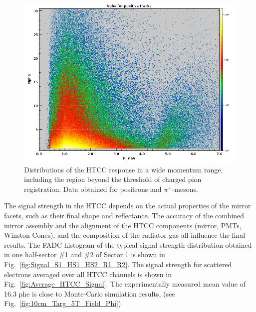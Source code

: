 \begin{figure}[!ht]
    \centering
    \includegraphics[width=1.0\linewidth,trim={0.0cm 0.0cm 0.0cm 0.0cm},clip]{images/positivePNPEC6595.png}
    \caption{Distributions of the HTCC response in a wide momentum range, including the region beyond the threshold of charged pion registration. Data obtained for positrons and $\pi^{+}$-mesons.}
    \label{fig:positivePNPEC6595}
\end{figure}

The signal strength in the HTCC depends on the actual properties of the mirror facets, such as their final shape and reflectance. The accuracy of the combined mirror assembly and the alignment of the HTCC components (mirror, PMTs, Winston Cones), and the composition of the radiator gas all influence the final results. The FADC histogram of  the typical signal strength distribution obtained in one half-sector \#1 and \#2 of Sector 1 is shown in Fig.~\ref{fig:Signal_S1_HS1_HS2_R1_R2}. The signal strength for scattered electrons averaged over all HTCC channels is shown in Fig.~\ref{fig:Average_HTCC_Signal}. The experimentally measured mean value of 16.3 phe is close to Monte-Carlo simulation results, (see Fig.~\ref{fig:10cm_Targ_5T_Field_Phi}).

